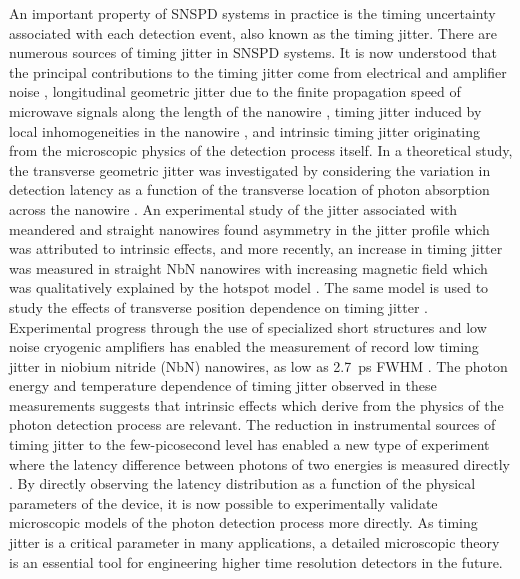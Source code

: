\documentclass[%
reprint,
 amsmath,amssymb,
aps,
pra,
]{revtex4-1}
\begin{document}
\quad An important property of SNSPD systems in practice is the timing uncertainty associated with each detection event, also known as the timing jitter.  There are numerous sources of timing jitter in SNSPD systems.  It is now understood that the principal contributions to the timing jitter come from electrical and amplifier noise \cite{zhao_intrinsic_2011, wu_improving_2017}, longitudinal geometric jitter due to the finite propagation speed of microwave signals along the length of the nanowire \cite{calandri_superconducting_2016,zhao_single-photon_2017}, timing jitter induced by local inhomogeneities in the nanowire \cite{oconnor_spatial_2011,cheng_inhomogeneity-induced_2017}, and intrinsic timing jitter originating from the microscopic physics of the detection process itself. In a theoretical study, the transverse geometric jitter was investigated by considering the variation in detection latency as a function of the transverse location of photon absorption across the nanowire \cite{wu_vortex-crossing-induced_2017}. An experimental study of the jitter associated with meandered \cite{sidorova_physical_2017} and straight \cite{sidorova_intrinsic_2018} nanowires found asymmetry in the jitter profile which was attributed to intrinsic effects, and more recently, an increase in timing jitter was measured in straight NbN nanowires with increasing magnetic field \cite{sidorova_timing_2018} which was qualitatively explained by the hotspot model \cite{vodolazov_single-photon_2017}. The same model is used to study the effects of transverse position dependence on timing jitter \cite{vodolazov_minimal_2018}. Experimental progress through the use of specialized short structures and low noise cryogenic amplifiers has enabled the measurement of record low timing jitter in niobium nitride (NbN) nanowires, as low as 2.7~ps FWHM \cite{korzh_demonstrating_2018}. The photon energy and temperature dependence of timing jitter observed in these measurements suggests that intrinsic effects which derive from the physics of the photon detection process are relevant.  The reduction in instrumental sources of timing jitter to the few-picosecond level has enabled a new type of experiment where the latency difference between photons of two energies is measured directly \cite{korzh_demonstrating_2018}.  By directly observing the latency distribution as a function of the physical parameters of the device, it is now possible to experimentally validate microscopic models of the photon detection process more directly. As timing jitter is a critical parameter in many applications, a detailed microscopic theory is an essential tool for engineering higher time resolution detectors in the future.
\end{document}
